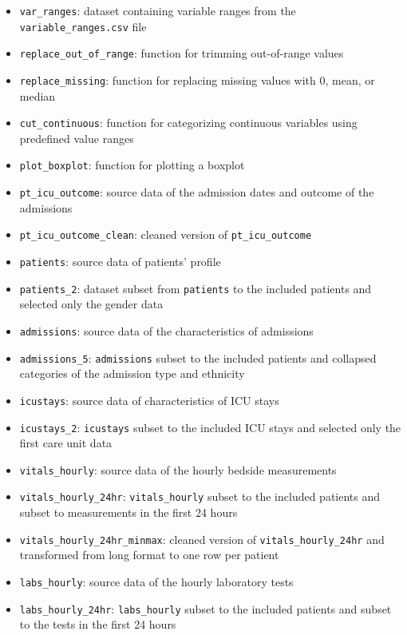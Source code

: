 \documentclass[
]{article}
\providecommand{\tightlist}{%
  \setlength{\itemsep}{0pt}\setlength{\parskip}{0pt}}
\begin{document}
\begin{itemize}
\tightlist
\item
  \texttt{var\_ranges}: dataset containing variable ranges from the
  \texttt{variable\_ranges.csv} file
\item
  \texttt{replace\_out\_of\_range}: function for trimming out-of-range
  values
\item
  \texttt{replace\_missing}: function for replacing missing values with
  0, mean, or median
\item
  \texttt{cut\_continuous}: function for categorizing continuous
  variables using predefined value ranges
\item
  \texttt{plot\_boxplot}: function for plotting a boxplot
\item
  \texttt{pt\_icu\_outcome}: source data of the admission dates and
  outcome of the admissions
\item
  \texttt{pt\_icu\_outcome\_clean}: cleaned version of
  \texttt{pt\_icu\_outcome}
\item
  \texttt{patients}: source data of patients' profile
\item
  \texttt{patients\_2}: dataset subset from \texttt{patients} to the
  included patients and selected only the gender data
\item
  \texttt{admissions}: source data of the characteristics of admissions
\item
  \texttt{admissions\_5}: \texttt{admissions} subset to the included
  patients and collapsed categories of the admission type and ethnicity
\item
  \texttt{icustays}: source data of characteristics of ICU stays
\item
  \texttt{icustays\_2}: \texttt{icustays} subset to the included ICU
  stays and selected only the first care unit data
\item
  \texttt{vitals\_hourly}: source data of the hourly bedside
  measurements
\item
  \texttt{vitals\_hourly\_24hr}: \texttt{vitals\_hourly} subset to the
  included patients and subset to measurements in the first 24 hours
\item
  \texttt{vitals\_hourly\_24hr\_minmax}: cleaned version of
  \texttt{vitals\_hourly\_24hr} and transformed from long format to one
  row per patient
\item
  \texttt{labs\_hourly}: source data of the hourly laboratory tests
\item
  \texttt{labs\_hourly\_24hr}: \texttt{labs\_hourly} subset to the
  included patients and subset to the tests in the first 24 hours

\end{itemize}
\end{document}
